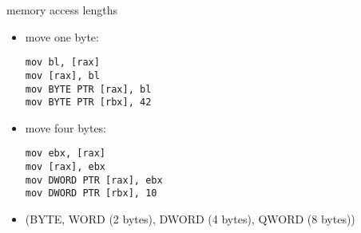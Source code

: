 \begin{frame}[fragile,label=valueLengths]{memory access lengths}
\lstset{language=myasm,style=small}
\begin{itemize}
\item move one byte:
\begin{lstlisting}
mov bl, [rax]
mov [rax], bl
mov BYTE PTR [rax], bl
mov BYTE PTR [rbx], 42
\end{lstlisting}
\item move four bytes:
\begin{lstlisting}
mov ebx, [rax]
mov [rax], ebx
mov DWORD PTR [rax], ebx
mov DWORD PTR [rbx], 10
\end{lstlisting}
\item (BYTE, WORD (2 bytes), DWORD (4 bytes), QWORD (8 bytes))
\end{itemize}
\end{frame}

